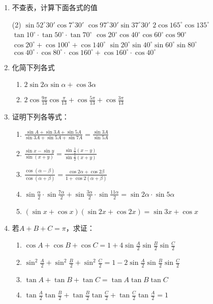 \begin{enumerate}
\item 不查表，计算下面各式的值
\begin{tasks}(2)
\task $\sin 52^{\circ} 30' \cos 7^{\circ} 30'$
\task $\cos 97^{\circ} 30' \sin 37^{\circ} 30'$
\task  $2 \cos 165^{\circ} \cos 135^{\circ}$
\task  $\tan 10^{\circ} \cdot \tan 50^{\circ} \cdot \tan 70^{\circ} $
\task  $\cos 20^{\circ} \cos 40^{\circ} \cos 60^{\circ} \cos 90^{\circ}$
\task  $\cos 20^{\circ}+\cos 100^{\circ}+\cos 140^{\circ}$
\task  $\sin 20^{\circ} \sin 40^{\circ} \sin 60^{\circ} \sin 80^{\circ}$
\task  $\cos 40^{\circ} \cdot \cos 80^{\circ} \cdot \cos 160^{\circ}+\cos 160^{\circ} \cdot \cos 40^{\circ}$  
\end{tasks}

\item 化简下列各式
\begin{enumerate}
\item $2 \sin 2 \alpha \sin \alpha+\cos 3 \alpha$
\item $2 \cos \frac{9 \pi}{13} \cos \frac{\pi}{13}+\cos \frac{5 \pi}{13}+\cos \frac{3 \pi}{13}$
\end{enumerate}


\item 证明下列各等式：
\begin{enumerate}
\item $\frac{\sin A+\sin 3 A+\sin 5 A}{\sin 3 A+\sin 5 A+\sin 7 A}=\frac{\sin 3 A}{\sin 5 A}$
\item $\frac{\sin x-\sin y}{\sin (x+y)}=\frac{\sin \frac{1}{2}(x-y)}{\sin \frac{1}{2}(x+y)}$
\item $\frac{\cos(\alpha-\beta)}{\cos(\alpha+\beta)}=\frac{\cos2\alpha+\cos2\beta}{1+\cos 2(\alpha+\beta)}$
\item $\sin\frac{\alpha}{2}\cdot \sin\frac{7\alpha}{2}+\sin\frac{3\alpha}{2}\cdot\sin\frac{11\alpha}{2}=\sin2\alpha\cdot \sin 5\alpha$
\item $(\sin x+\cos x)(\sin 2x+\cos 2x)=\sin3x+\cos x$
\end{enumerate}

\item 若$A+B+C=\pi$，求证：
\begin{enumerate}
    \item $\cos A+\cos B+\cos C=1+4\sin\frac{A}{2}\sin\frac{B}{2}\sin\frac{C}{2}$
    \item $\sin^2\frac{A}{2}+\sin^2\frac{B}{2}+\sin^2\frac{C}{2}=1-2\sin\frac{A}{2}\sin\frac{B}{2}\sin\frac{C}{2}$
    \item $\tan A+\tan B+\tan C=\tan A\tan B\tan C$
    \item $\tan\frac{A}{2}\tan\frac{B}{2}+\tan\frac{B}{2}\tan\frac{C}{2}+\tan\frac{C}{2}\tan\frac{A}{2}=1$
\end{enumerate}


\end{enumerate}
